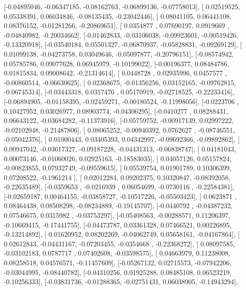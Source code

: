 \documentclass{article}
\begin{document}
       [-0.04895046, -0.06347185, -0.08162763, -0.06899136, -0.07758013],
       [ 0.02519525,  0.05338391,  0.06034846, -0.08135435, -0.23042446],
       [ 0.08041105,  0.06441108,  0.08376152, -0.01281266, -0.20869651],
       [ 0.0354877 ,  0.07690197,  0.0919669 , -0.04840982, -0.20034662],
       [-0.01462833, -0.03106038, -0.09923601, -0.00519426, -0.13320918],
       [-0.03540184,  0.05501327, -0.06870937, -0.05828831, -0.09269129],
       [ 0.01099138, -0.04273758,  0.03049646, -0.05097877, -0.20796151],
       [-0.08574942,  0.05785786,  0.09077628,  0.06945979, -0.10199022],
       [-0.00196377,  0.08484786,  0.01815834,  0.09008642, -0.21314614],
       [ 0.0448728 ,  0.02935996,  0.0457577 , -0.00860514, -0.06630625],
       [ 0.02368675, -0.01356256,  0.03152165, -0.09762815, -0.06745314],
       [-0.03443318,  0.0317476 ,  0.05170919, -0.02718525, -0.22233416],
       [-0.06894905, -0.01158395, -0.02459271, -0.00180524, -0.11998056],
       [-0.0223706 ,  0.10427952,  0.03026977,  0.08903774, -0.04306295],
       [-0.0410277 ,  0.08288431,  0.06643122, -0.03684282, -0.11373916],
       [-0.05759752, -0.00917139,  0.02997222, -0.02102048, -0.21487806],
       [ 0.08065252, -0.00940392,  0.0762627 , -0.08746551, -0.05042376],
       [ 0.01000443,  0.03405393,  0.04342997, -0.09692366, -0.09892862],
       [ 0.00947042, -0.03617327, -0.09187228, -0.04431313, -0.06838747],
       [ 0.04181043,  0.00073146, -0.01060026,  0.02925163, -0.18583035],
       [ 0.04057126,  0.05157824, -0.00823855,  0.07932749, -0.09559615],
       [ 0.05539754,  0.01901789,  0.10306399,  0.07208522, -0.1961214 ],
       [ 0.02012284,  0.09202375,  0.10320847, -0.08392058, -0.22635489],
       [-0.0359653 , -0.0216939 ,  0.06054699, -0.0730116 , -0.22584381],
       [-0.02659187,  0.00464155, -0.03858727, -0.10517226, -0.05503423],
       [ 0.0623871 ,  0.08464438,  0.08508298, -0.08234889, -0.19145707],
       [-0.0440792 , -0.04387232,  0.07546675,  0.0315982 , -0.03753297],
       [-0.05408563, -0.00288571,  0.11206397, -0.10669415, -0.17441755],
       [-0.04473787,  0.03361328,  0.07466521,  0.00226895, -0.13214892],
       [ 0.01620952,  0.08202269, -0.04062749,  0.05658161, -0.04167864],
       [ 0.02612843, -0.04431167, -0.07203455, -0.0354668 , -0.22368272],
       [ 0.08097585, -0.03102183,  0.0787717 ,  0.07402608, -0.03598575],
       [ 0.04663979,  0.11238008,  0.08258518,  0.04576571, -0.11457609],
       [-0.05267132,  0.02715573, -0.07942206, -0.03044995, -0.08440782],
       [-0.04310256,  0.01925288,  0.08485108,  0.06523219, -0.10256333],
       [-0.03831736, -0.01288365, -0.02751431,  0.06038905, -0.14943294],
\end{document}
